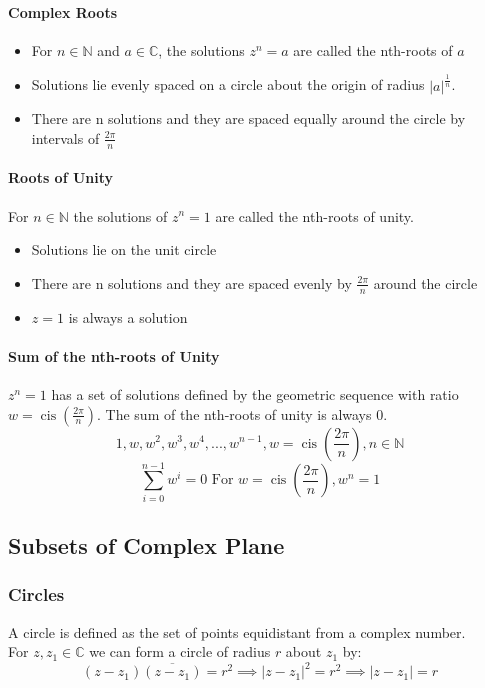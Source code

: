 \documentclass[a4paper,twoside]{article}
\DeclareMathOperator\cis{cis}
\begin{document}
			\paragraph{Complex Roots}
			\begin{itemize}
				\item For $n\in\mathbb{N}$ and $a\in\mathbb{C}$, the solutions $z^n=a$ are called the nth-roots of $a$
				\item Solutions lie evenly spaced on a circle about the origin of radius $|a|^{\frac{1}{n}}$.
				\item There are n solutions and they are spaced equally around the circle by intervals of $\frac{2\pi}{n}$
			\end{itemize}
			
			\paragraph{Roots of Unity} For $n\in\mathbb{N}$ the solutions of $z^n=1$ are called the nth-roots of unity.
			\begin{itemize}
				\item Solutions lie on the unit circle
				\item There are n solutions and they are spaced evenly by $\frac{2\pi}{n}$ around the circle
				\item $z=1$ is always a solution
			\end{itemize}
		
			\paragraph{Sum of the nth-roots of Unity} $z^n=1$ has a set of solutions defined by the geometric sequence with ratio $w=\cis\left(\frac{2\pi}{n}\right)$. The sum of the nth-roots of unity is always 0.
			\[
				1,w,w^2,w^3,w^4,...,w^{n-1},w=\cis\left(\frac{2\pi}{n}\right),n\in\mathbb{N}
			\]
			\[
				\sum\limits_{i=0}^{n-1}w^i=0 \text{ For }w=\cis\left(\frac{2\pi}{n}\right),w^n=1
			\]
		\subsection{Subsets of Complex Plane}
			\subsubsection{Circles}
				A circle is defined as the set of points equidistant from a complex number.\\
				For $z,z_1\in\mathbb{C}$ we can form a circle of radius $r$ about $z_1$ by:
				\[
					\left(z-z_1\right)\overline{\left(z-z_1\right)}=r^2\implies |z-z_1|^2=r^2 \implies |z-z_1|=r
				\]
\end{document}
